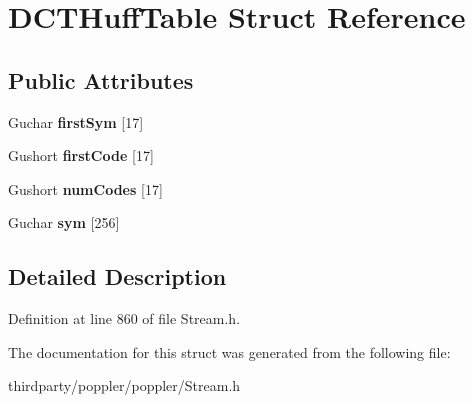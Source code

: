 \hypertarget{struct_d_c_t_huff_table}{}\section{D\+C\+T\+Huff\+Table Struct Reference}
\label{struct_d_c_t_huff_table}
\subsection*{Public Attributes}
\begin{DoxyCompactItemize}
\item 
\mbox{\label{struct_d_c_t_huff_table_a882f8bf4d0258096fd3252499c4f17dd}} 
Guchar {\bfseries first\+Sym} \mbox{[}17\mbox{]}
\item 
\mbox{\label{struct_d_c_t_huff_table_aa3d5f8f5275a5e8ccb135fe59afb46ee}} 
Gushort {\bfseries first\+Code} \mbox{[}17\mbox{]}
\item 
\mbox{\label{struct_d_c_t_huff_table_af3ac1cda2c525fbeb6e45a02c41fe6fa}} 
Gushort {\bfseries num\+Codes} \mbox{[}17\mbox{]}
\item 
\mbox{\label{struct_d_c_t_huff_table_a9cda36ede7b8d14a8c3531e3105db0f1}} 
Guchar {\bfseries sym} \mbox{[}256\mbox{]}
\end{DoxyCompactItemize}


\subsection{Detailed Description}


Definition at line 860 of file Stream.\+h.



The documentation for this struct was generated from the following file\+:\begin{DoxyCompactItemize}
\item 
thirdparty/poppler/poppler/Stream.\+h\end{DoxyCompactItemize}
